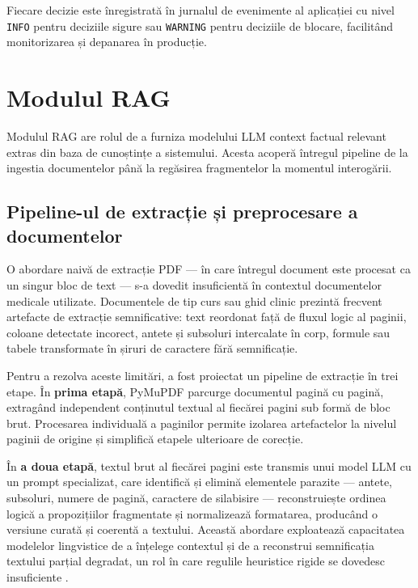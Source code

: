 \documentclass[12pt, a4paper, oneside, romanian]{teza-upb}
\begin{document}
Fiecare decizie este înregistrată în jurnalul de evenimente al aplicației cu nivel \texttt{INFO} pentru deciziile sigure sau \texttt{WARNING} pentru deciziile de blocare, facilitând monitorizarea și depanarea în producție.

\section{Modulul RAG}

Modulul RAG are rolul de a furniza modelului LLM context factual relevant extras din baza de cunoștințe a sistemului. Acesta acoperă întregul pipeline de la ingestia documentelor până la regăsirea fragmentelor la momentul interogării.

\subsection{Pipeline-ul de extracție și preprocesare a documentelor}

O abordare naivă de extracție PDF — în care întregul document este procesat ca un singur bloc de text — s-a dovedit insuficientă în contextul documentelor medicale utilizate. Documentele de tip curs sau ghid clinic prezintă frecvent artefacte de extracție semnificative: text reordonat față de fluxul logic al paginii, coloane detectate incorect, antete și subsoluri intercalate în corp, formule sau tabele transformate în șiruri de caractere fără semnificație.

Pentru a rezolva aceste limitări, a fost proiectat un pipeline de extracție în trei etape. În \textbf{prima etapă}, PyMuPDF parcurge documentul pagină cu pagină, extragând independent conținutul textual al fiecărei pagini sub formă de bloc brut. Procesarea individuală a paginilor permite izolarea artefactelor la nivelul paginii de origine și simplifică etapele ulterioare de corecție.

În \textbf{a doua etapă}, textul brut al fiecărei pagini este transmis unui model LLM cu un prompt specializat, care identifică și elimină elementele parazite — antete, subsoluri, numere de pagină, caractere de silabisire — reconstruiește ordinea logică a propozițiilor fragmentate și normalizează formatarea, producând o versiune curată și coerentă a textului. Această abordare exploatează capacitatea modelelor lingvistice de a înțelege contextul și de a reconstrui semnificația textului parțial degradat, un rol în care regulile heuristice rigide se dovedesc insuficiente \cite{llm_review_2024}.
\end{document}
